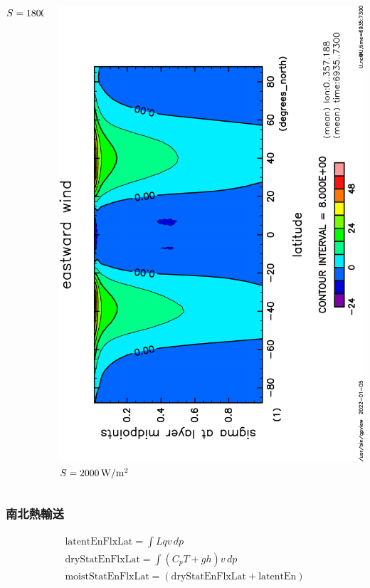 \documentclass[aspectratio=149,9pt,fleqn]{beamer}
\begin{document}
\begin{frame}
\begin{columns}[T]
\begin{column}{.3\textwidth}
			\(S=1800\hmu{W/m^2}\)
		\end{column}
		\begin{column}{.3\textwidth}
			\centering
			\includegraphics[height=\textwidth,angle=-90]{S2000/U,time=6935:7300-crop.pdf}
			\(S=2000\hmu{W/m^2}\)
		\end{column}
	\end{columns}
\end{frame}

\begin{frame}
	\frametitle{南北熱輸送}
	\begin{gather*}
		\mathrm{latentEnFlxLat}=\int Lqv\,dp\tag{潜熱輸送}\\
		\mathrm{dryStatEnFlxLat}=\int (C_pT+gh)v\,dp\tag{乾燥静的エネルギー}\\
		\mathrm{moistStatEnFlxLat}=(\mathrm{dryStatEnFlxLat}+\mathrm{latentEn})\tag{湿潤静的エネルギー}
		\\
	\end{gather*}
\end{frame}
\end{document}
